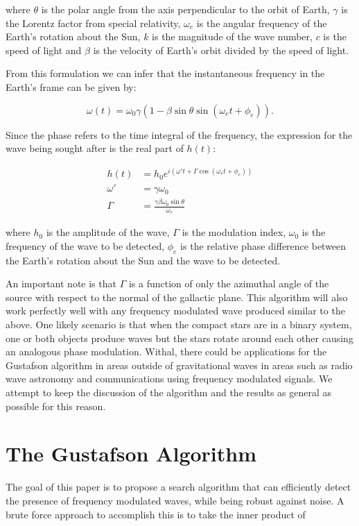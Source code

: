 \documentclass[onecolumn, groupedaddress, 10pt]{revtex4-1}
\begin{document}
where $\theta$ is the polar angle from the axis perpendicular to the orbit of Earth, $\gamma$ is the Lorentz factor from special relativity, $\omega_e$ is the angular frequency of the Earth's rotation about the Sun, $k$ is the magnitude of the wave number, $c$ is the speed of light and $\beta$ is the velocity of Earth's orbit divided by the speed of light.

From this formulation we can infer that the instantaneous frequency in the Earth's frame can be given by:

\begin{equation}
\omega (t) = \omega_0 \gamma \left( 1 - \beta \sin \theta \sin (\omega_e t + \phi_e) \right). 
\end{equation}

Since the phase refers to the time integral of the frequency, the expression for the wave being sought after is the real part of $h(t)$: 

\begin{align}
h(t)    &= h_0 e^{i \left( \omega' t + \Gamma \cos (\omega_e t + \phi_e) \right)}		\\
\omega' &= \gamma \omega_0															\\
\Gamma  &= \frac{\gamma \beta \omega_0 \sin \theta}{\omega_e}
\end{align}


where $h_0$ is the amplitude of the wave, $\Gamma$ is the modulation index, $\omega_0$ is the frequency of the wave to be detected, $\phi_e$ is the relative phase difference between the Earth's rotation about the Sun and the wave to be detected.


An important note is that $\Gamma$ is a function of only the azimuthal angle of the source with respect to the normal of the gallactic plane. This algorithm will also work perfectly well with any frequency modulated wave produced similar to the above. One likely scenario is that when the compact stars are in a binary system, one or both objects produce waves but the stars rotate around each other causing an analogous phase modulation.  Withal, there could be applications for the Gustafson algorithm in areas outside of gravitational waves in areas such as radio wave astronomy and communications using frequency modulated signals. We attempt to keep the discussion of the algorithm and the results as general as possible for this reason.

\section{The Gustafson Algorithm}
The goal of this paper is to propose a search algorithm that can efficiently detect the presence of frequency modulated waves, while being robust against noise.  A brute force approach to accomplish this is to take the inner product of 
\end{document}
